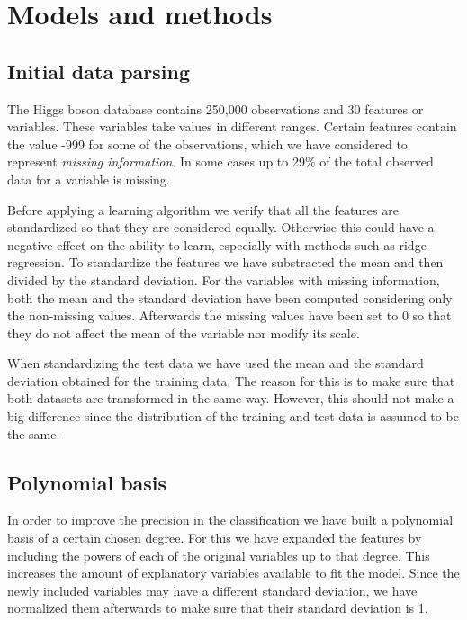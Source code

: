 \documentclass[10pt,conference,compsocconf]{IEEEtran}
\begin{document}
\section{Models and methods}
\label{sec:models-methods}
\subsection{Initial data parsing} %
\label{sub:initial_data_parsing}
  The Higgs boson database contains 250,000 observations and 30 features or variables. These variables take values in different ranges. Certain features contain the value -999 for some of the observations, which we have considered to represent \emph{missing information}. In some cases up to 29\% of the total observed data for a variable is missing.

  Before applying a learning algorithm we verify that all the features are standardized so that they are considered equally. Otherwise this could have a negative effect on the ability to learn, especially with methods such as ridge regression. To standardize the features we have substracted the mean and then divided by the standard deviation. For the variables with missing information, both the mean and the standard deviation have been computed considering only the non-missing values. Afterwards the missing values have been set to 0 so that they do not affect the mean of the variable nor modify its scale.

  When standardizing the test data we have used the mean and the standard deviation obtained for the training data. The reason for this is to make sure that both datasets are transformed in the same way. However, this should not make a big difference since the distribution of the training and test data is assumed to be the same.

\subsection{Polynomial basis} %
\label{sub:polynomial_basis}
  In order to improve the precision in the classification we have built a polynomial basis of a certain chosen degree. For this we have expanded the features by including the powers of each of the original variables up to that degree. This increases the amount of explanatory variables available to fit the model. Since the newly included variables may have a different standard deviation, we have normalized them afterwards to make sure that their standard deviation is 1.
\end{document}
